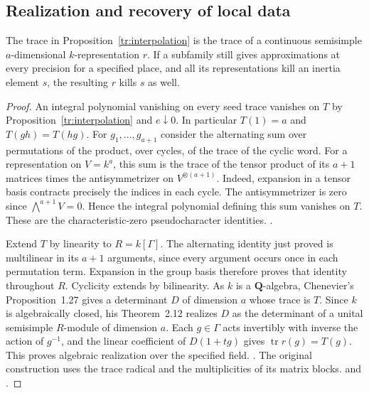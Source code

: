 \subsection{Realization and recovery of local data}
\begin{proposition}\label{tr:realize}
The trace in Proposition~\ref{tr:interpolation} is the trace of a continuous semisimple \(a\)-dimensional \(k\)-representation \(r\). If a subfamily still gives approximations at every precision for a specified place, and all its representations kill an inertia element \(s\), the resulting \(r\) kills \(s\) as well.
\end{proposition}
\begin{proof}
An integral polynomial vanishing on every seed trace vanishes on \(T\) by Proposition~\ref{tr:interpolation} and \(e\downarrow0\). In particular \(T(1)=a\) and \(T(gh)=T(hg)\). For \(g_1,\ldots,g_{a+1}\) consider the alternating sum over permutations of the product, over cycles, of the trace of the cyclic word. For a representation on \(V=k^a\), this sum is the trace of the tensor product of its \(a+1\) matrices times the antisymmetrizer on \(V^{\otimes(a+1)}\). Indeed, expansion in a tensor basis contracts precisely the indices in each cycle. The antisymmetrizer is zero since \(\bigwedge^{a+1}V=0\). Hence the integral polynomial defining this sum vanishes on \(T\). These are the characteristic-zero pseudocharacter identities. .

Extend \(T\) by linearity to \(R=k[\Gamma]\). The alternating identity just proved is multilinear in its \(a+1\) arguments, since every argument occurs once in each permutation term. Expansion in the group basis therefore proves that identity throughout \(R\). Cyclicity extends by bilinearity. As \(k\) is a \(\mathbf Q\)-algebra, Chenevier's Proposition~1.27 gives a determinant \(D\) of dimension \(a\) whose trace is \(T\). Since \(k\) is algebraically closed, his Theorem~2.12 realizes \(D\) as the determinant of a unital semisimple \(R\)-module of dimension \(a\). Each \(g\in\Gamma\) acts invertibly with inverse the action of \(g^{-1}\), and the linear coefficient of \(D(1+tg)\) gives \(\operatorname{tr} r(g)=T(g)\). This proves algebraic realization over the specified field. \cite{chenevier}. The original construction uses the trace radical and the multiplicities of its matrix blocks.  and .


\end{proof}
